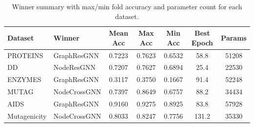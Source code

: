 \begin{table}[t]
\centering
\small
\caption{Winner summary with max/min fold accuracy and parameter count for each dataset.}
\label{tab:all_winners}
\begin{tabular}{l l c c c c c}
\toprule
Dataset & Winner & Mean Acc & Max Acc & Min Acc & Best Epoch & Params \\
\midrule
PROTEINS & GraphResGNN & 0.7223 & 0.7623 & 0.6532 & 58.8 & 51208 \\
DD & NodeResGNN & 0.7207 & 0.7627 & 0.6894 & 25.4 & 22530 \\
ENZYMES & GraphResGNN & 0.3117 & 0.3750 & 0.1667 & 91.4 & 52248 \\
MUTAG & NodeCrossGNN & 0.7397 & 0.8649 & 0.6757 & 88.2 & 34434 \\
AIDS & GraphResGNN & 0.9160 & 0.9275 & 0.8925 & 83.8 & 57928 \\
Mutagenicity & NodeCrossGNN & 0.8033 & 0.8247 & 0.7756 & 131.2 & 35330 \\
\bottomrule
\end{tabular}
\end{table}
